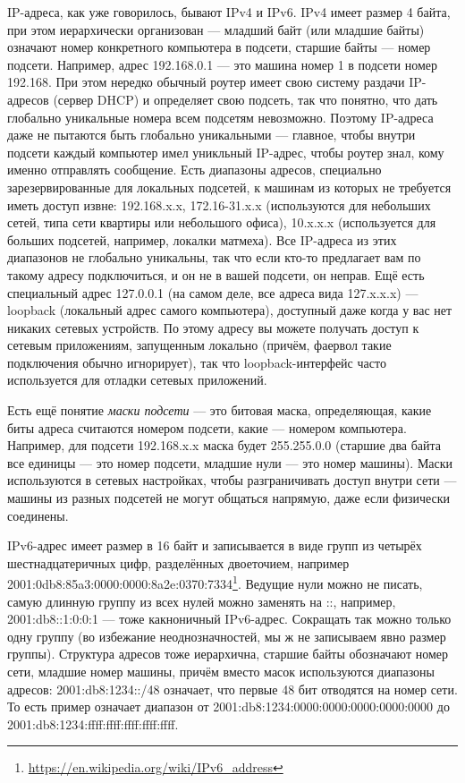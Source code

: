 \documentclass[a5paper]{article}
\begin{document}
IP-адреса, как уже говорилось, бывают IPv4 и IPv6. IPv4 имеет размер 4 байта, при этом иерархически организован --- младший байт (или младшие байты) означают номер конкретного компьютера в подсети, старшие байты --- номер подсети. Например, адрес 192.168.0.1 --- это машина номер 1 в подсети номер 192.168. При этом нередко обычный роутер имеет свою систему раздачи IP-адресов (сервер DHCP) и определяет свою подсеть, так что понятно, что дать глобально уникальные номера всем подсетям невозможно. Поэтому IP-адреса даже не пытаются быть глобально уникальными --- главное, чтобы внутри подсети каждый компьютер имел уникльный IP-адрес, чтобы роутер знал, кому именно отправлять сообщение. Есть диапазоны адресов, специально зарезервированные для локальных подсетей, к машинам из которых не требуется иметь доступ извне: 192.168.x.x, 172.16-31.x.x (используются для небольших сетей, типа сети квартиры или небольшого офиса), 10.x.x.x (используется для больших подсетей, например, локалки матмеха). Все IP-адреса из этих диапазонов не глобально уникальны, так что если кто-то предлагает вам по такому адресу подключиться, и он не в вашей подсети, он неправ. Ещё есть специальный адрес 127.0.0.1 (на самом деле, все адреса вида 127.x.x.x) ---  loopback (локальный адрес самого компьютера), доступный даже когда у вас нет никаких сетевых устройств. По этому адресу вы можете получать доступ к сетевым приложениям, запущенным локально (причём, фаервол такие подключения обычно игнорирует), так что loopback-интерфейс часто используется для отладки сетевых приложений. 

Есть ещё понятие \textit{маски подсети} --- это битовая маска, определяющая, какие биты адреса считаются номером подсети, какие --- номером компьютера. Например, для подсети 192.168.x.x маска будет 255.255.0.0 (старшие два байта все единицы --- это номер подсети, младшие нули --- это номер машины). Маски используются в сетевых настройках, чтобы разграничивать доступ внутри сети --- машины из разных подсетей не могут общаться напрямую, даже если физически соединены.

IPv6-адрес имеет размер в 16 байт и записывается в виде групп из четырёх шестнадцатеричных цифр, разделённых двоеточием, например 2001:0db8:85a3:0000:0000:8a2e:0370:7334\footnote{\url{https://en.wikipedia.org/wiki/IPv6_address}}. Ведущие нули можно не писать, самую длинную группу из всех нулей можно заменять на ::, например, 2001:db8::1:0:0:1 --- тоже какноничный IPv6-адрес. Сокращать так можно только одну группу (во избежание неоднозначностей, мы ж не записываем явно размер группы). Структура адресов тоже иерархична, старшие байты обозначают номер сети, младшие номер машины, причём вместо масок используются диапазоны адресов: 2001:db8:1234::/48 означает, что первые 48 бит отводятся на номер сети. То есть пример означает диапазон от 2001:db8:1234:0000:0000:0000:0000:0000 до 2001:db8:1234:ffff:ffff:ffff:ffff:ffff.
\end{document}
